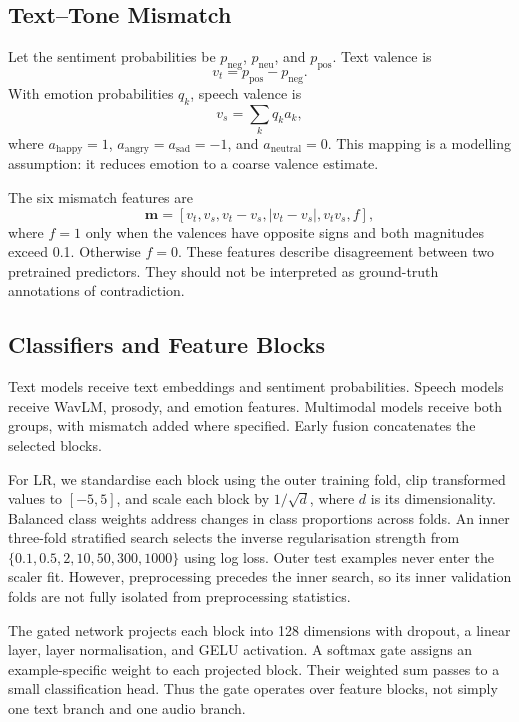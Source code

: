 \documentclass[conference]{IEEEtran}
\begin{document}
\subsection{Text--Tone Mismatch}
Let the sentiment probabilities be $p_{\mathrm{neg}}$, $p_{\mathrm{neu}}$, and $p_{\mathrm{pos}}$. Text valence is
\begin{equation}
v_t = p_{\mathrm{pos}} - p_{\mathrm{neg}}.
\end{equation}
With emotion probabilities $q_k$, speech valence is
\begin{equation}
v_s = \sum_k q_k a_k,
\end{equation}
where $a_{\mathrm{happy}}=1$, $a_{\mathrm{angry}}=a_{\mathrm{sad}}=-1$, and $a_{\mathrm{neutral}}=0$. This mapping is a modelling assumption: it reduces emotion to a coarse valence estimate.

The six mismatch features are
\begin{equation}
\mathbf{m} = [v_t,v_s,v_t-v_s,|v_t-v_s|,v_tv_s,f],
\end{equation}
where $f=1$ only when the valences have opposite signs and both magnitudes exceed 0.1. Otherwise $f=0$. These features describe disagreement between two pretrained predictors. They should not be interpreted as ground-truth annotations of contradiction.

\subsection{Classifiers and Feature Blocks}
Text models receive text embeddings and sentiment probabilities. Speech models receive WavLM, prosody, and emotion features. Multimodal models receive both groups, with mismatch added where specified. Early fusion concatenates the selected blocks.

For LR, we standardise each block using the outer training fold, clip transformed values to $[-5,5]$, and scale each block by $1/\sqrt{d}$, where $d$ is its dimensionality. Balanced class weights address changes in class proportions across folds. An inner three-fold stratified search selects the inverse regularisation strength from $\{0.1,0.5,2,10,50,300,1000\}$ using log loss. Outer test examples never enter the scaler fit. However, preprocessing precedes the inner search, so its inner validation folds are not fully isolated from preprocessing statistics.

The gated network projects each block into 128 dimensions with dropout, a linear layer, layer normalisation, and GELU activation. A softmax gate assigns an example-specific weight to each projected block. Their weighted sum passes to a small classification head. Thus the gate operates over feature blocks, not simply one text branch and one audio branch.
\end{document}

